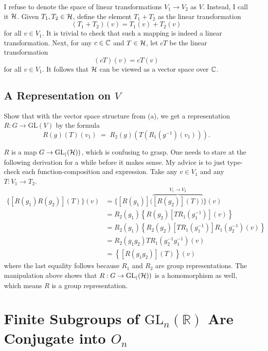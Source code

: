 \documentclass[12pt]{article}
\begin{document}
I refuse to denote the space of linear transformations $V_1 \rightarrow V_2$ as $V$. 
Instead, I call it $\mathcal{H}$. 
Given $T_1, T_2 \in \mathcal{H}$, define the element $T_1 + T_2$ as the linear transformation 
$$(T_1 + T_2)(v) = T_1(v) + T_2(v)$$ 
for all $v \in V_1$. 
It is trivial to check that such a mapping is indeed a linear transformation. 
Next, for any $c \in \mathbb{C}$ and $T \in \mathcal{H}$, let $cT$ be the linear transformation 
$$(cT)(v) = cT(v)$$
for all $v \in V_1$. 
It follows that $\mathcal{H}$ can be viewed as a vector space over $\mathbb{C}$. 

\subsection{A Representation on $V$}

Show that with the vector space structure from (a), we get a representation
$R \colon G \to \mathrm{GL}(V)$ by the formula
\[
  R(g)(T)(v_1) \;=\; R_2(g)\!\left(T\!\left(R_1(g^{-1})(v_1)\right)\right).
\]
\noindent\dotfill 

$R$ is a map $G \rightarrow \text{GL}_{(}(\mathcal{H}))$, which is confusing to grasp. 
One needs to stare at the following derivation for a while before it makes sense. 
My advice is to just type-check each function-composition and expression. 
Take any $v \in V_1$ and any $T: V_1 \rightarrow T_2$. 
\begin{align*}
  \{[R(g_1)R(g_2)](T)\} (v) 
  & = \{[R(g_1)](\overbrace{[R(g_2)](T))}^{V_1 \rightarrow V_2} \} (v) \\ 
  & = R_{2} (g_1) \left\{ R(g_2) [T R_{1}(g_{1}^{-1})] (v) \right\}  \\ 
  & = R_{2} (g_1) \left\{ R_{2} (g_2) [T R_1(g_{1}^{-1})] R_{1}(g_{2}^{-1}) (v) \right \} \\ 
  & = R_2(g_1 g_2) T R_1(g_2^{-1} g_{1}^{-1}) (v) \\ 
  & = \left\{[R(g_1 g_2)] (T) \right\} (v)
\end{align*}
where the last equality follows because $R_1$ and $R_2$ are group representations. 
The manipulation above shows that $R: G \rightarrow \text{GL}_{(}(\mathcal{H}))$ is a homomorphism as well, which means $R$ is a group representation. 


\section{Finite Subgroups of $\mathrm{GL}_n(\mathbb{R})$ Are Conjugate into $O_n$}
\end{document}
